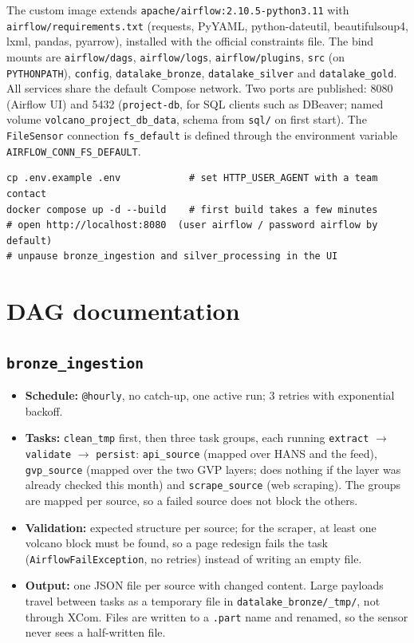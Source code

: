 \documentclass[11pt,a4paper]{article}
\begin{document}
\medskip
The custom image extends \texttt{apache/airflow:2.10.5-python3.11} with \texttt{airflow/requirements.txt} (requests, PyYAML, python-dateutil, beautifulsoup4, lxml, pandas, pyarrow), installed with the official constraints file. The bind mounts are \texttt{airflow/dags}, \texttt{airflow/logs}, \texttt{airflow/plugins}, \texttt{src} (on \texttt{PYTHONPATH}), \texttt{config}, \texttt{datalake\_bronze}, \texttt{datalake\_silver} and \texttt{datalake\_gold}. All services share the default Compose network. Two ports are published: 8080 (Airflow UI) and 5432 (\texttt{project-db}, for SQL clients such as DBeaver; named volume \texttt{volcano\_project\_db\_data}, schema from \texttt{sql/} on first start). The \texttt{FileSensor} connection \texttt{fs\_default} is defined through the environment variable \texttt{AIRFLOW\_CONN\_FS\_DEFAULT}.

\begin{lstlisting}
cp .env.example .env            # set HTTP_USER_AGENT with a team contact
docker compose up -d --build    # first build takes a few minutes
# open http://localhost:8080  (user airflow / password airflow by default)
# unpause bronze_ingestion and silver_processing in the UI
\end{lstlisting}

\section{DAG documentation}

\subsection{\texttt{bronze\_ingestion}}
\begin{itemize}
  \item \textbf{Schedule:} \texttt{@hourly}, no catch-up, one active run; 3 retries with exponential backoff.
  \item \textbf{Tasks:} \texttt{clean\_tmp} first, then three task groups, each running \texttt{extract} $\rightarrow$ \texttt{validate} $\rightarrow$ \texttt{persist}:
  \texttt{api\_source} (mapped over HANS and the feed), \texttt{gvp\_source} (mapped over the two GVP layers; does nothing if the layer was already checked this month) and \texttt{scrape\_source} (web scraping). The groups are mapped per source, so a failed source does not block the others.
  \item \textbf{Validation:} expected structure per source; for the scraper, at least one volcano block must be found, so a page redesign fails the task (\texttt{AirflowFailException}, no retries) instead of writing an empty file.
  \item \textbf{Output:} one JSON file per source with changed content. Large payloads travel between tasks as a temporary file in \texttt{datalake\_bronze/\_tmp/}, not through XCom. Files are written to a \texttt{.part} name and renamed, so the sensor never sees a half-written file.
\end{itemize}
\end{document}

